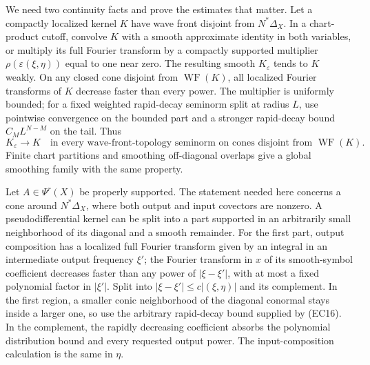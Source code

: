 \documentclass[
  11pt,
]{article}
\begin{document}
We need two continuity facts and prove the estimates that matter. Let a
compactly localized kernel \(K\) have wave front disjoint from
\(N^*\Delta_X\). In a chart-product cutoff, convolve \(K\) with a smooth
approximate identity in both variables, or multiply its full Fourier
transform by a compactly supported multiplier
\(\rho(\varepsilon(\xi,\eta))\) equal to one near zero. The resulting
smooth \(K_\varepsilon\) tends to \(K\) weakly. On any closed cone
disjoint from \(\operatorname{WF}(K)\), all localized Fourier transforms
of \(K\) decrease faster than every power. The multiplier is uniformly
bounded; for a fixed weighted rapid-decay seminorm split at radius
\(L\), use pointwise convergence on the bounded part and a stronger
rapid-decay bound \(C_ML^{N-M}\) on the tail. Thus \[
 K_\varepsilon\longrightarrow K
 \quad\text{in every wave-front-topology seminorm on cones
 disjoint from }\operatorname{WF}(K).
 \tag{EC18}
\] Finite chart partitions and smoothing off-diagonal overlaps give a
global smoothing family with the same property.

Let \(A\in\Psi^r(X)\) be properly supported. The statement needed here
concerns a cone around \(N^*\Delta_X\), where both output and input
covectors are nonzero. A pseudodifferential kernel can be split into a
part supported in an arbitrarily small neighborhood of its diagonal and
a smooth remainder. For the first part, output composition has a
localized full Fourier transform given by an integral in an intermediate
output frequency \(\xi'\); the Fourier transform in \(x\) of its
smooth-symbol coefficient decreases faster than any power of
\(|\xi-\xi'|\), with at most a fixed polynomial factor in \(|\xi'|\).
Split into \(|\xi-\xi'|\le c|(\xi,\eta)|\) and its complement. In the
first region, a smaller conic neighborhood of the diagonal conormal
stays inside a larger one, so use the arbitrary rapid-decay bound
supplied by (EC16). In the complement, the rapidly decreasing
coefficient absorbs the polynomial distribution bound and every
requested output power. The input-composition calculation is the same in
\(\eta\).
\end{document}
